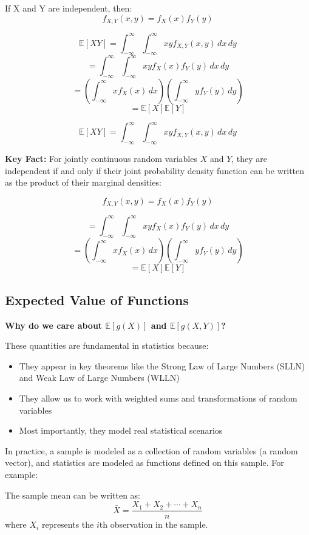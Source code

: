 \documentclass{article}
\begin{document}
    If X and Y are independent, then:
    \[f_{X,Y}(x,y) = f_X(x)f_Y(y)\]

    \[\mathbb{E}[XY] = \int_{-\infty}^{\infty} \int_{-\infty}^{\infty} xy f_{X,Y}(x,y) \, dx \, dy\]
    \[= \int_{-\infty}^{\infty} \int_{-\infty}^{\infty} xy f_X(x)f_Y(y) \, dx \, dy\]
    \[= \left(\int_{-\infty}^{\infty} x f_X(x) \, dx\right) \left(\int_{-\infty}^{\infty} y f_Y(y) \, dy\right)\]
    \[= \mathbb{E}[X]\mathbb{E}[Y]\]

    \[\mathbb{E}[XY] = \int_{-\infty}^{\infty} \int_{-\infty}^{\infty} xy f_{X,Y}(x,y) \, dx \, dy\]

    \textbf{Key Fact:} For jointly continuous random variables $X$ and $Y$, they are independent if and only if 
    their joint probability density function can be written as the product of their marginal densities:

    \[f_{X,Y}(x,y) = f_X(x)f_Y(y)\]

    \[= \int_{-\infty}^{\infty} \int_{-\infty}^{\infty} xy f_X(x)f_Y(y) \, dx \, dy\]
    \[= \left(\int_{-\infty}^{\infty} x f_X(x) \, dx\right) \left(\int_{-\infty}^{\infty} y f_Y(y) \, dy\right)\]
    \[= \mathbb{E}[X]\mathbb{E}[Y]\]

    \subsection*{Expected Value of Functions}
    
    \textbf{Why do we care about $\mathbb{E}[g(X)]$ and $\mathbb{E}[g(X,Y)]$?}
    
    These quantities are fundamental in statistics because:
    \begin{itemize}
        \item They appear in key theorems like the Strong Law of Large Numbers (SLLN) and Weak Law of Large Numbers (WLLN)
        \item They allow us to work with weighted sums and transformations of random variables
        \item Most importantly, they model real statistical scenarios
    \end{itemize}

    In practice, a sample is modeled as a collection of random variables (a random vector), and statistics are modeled as functions defined on this sample. For example:
    
    The sample mean can be written as:
    \[\bar{X} = \frac{X_1 + X_2 + \cdots + X_n}{n}\]
    where $X_i$ represents the $i$th observation in the sample.
\end{document}
